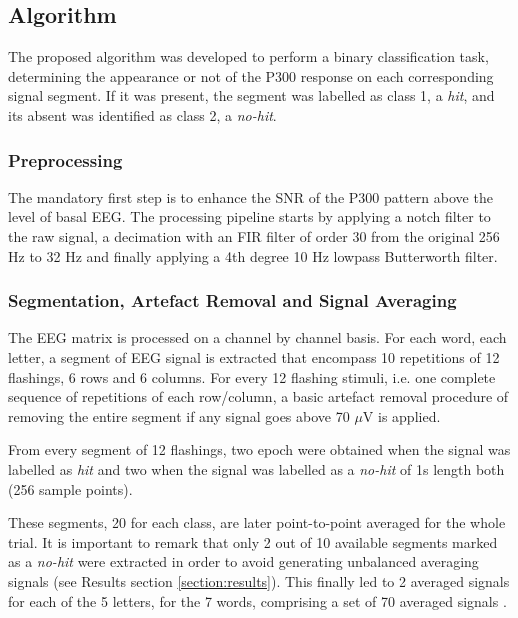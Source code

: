 \documentclass[entropy,article,submit,moreauthors,pdftex,10pt,a4paper]{mdpi}
\begin{document}
\subsection{Algorithm}

The proposed algorithm was developed to perform a binary classification task, determining the appearance or not of the P300 response on each corresponding signal segment.  If it was present, the segment was labelled as class 1, a \textit{hit}, and its absent was identified as class 2, a \textit{no-hit}.

\subsubsection{Preprocessing}

The mandatory first step is to enhance the SNR of the P300 pattern above the level of basal EEG. The processing pipeline starts by applying a notch filter to the raw signal, a decimation with an FIR filter of order 30 from the original 256 Hz to 32 Hz and finally applying a 4th degree 10 Hz lowpass Butterworth filter.  

\subsubsection{Segmentation, Artefact Removal and Signal Averaging}

The EEG matrix is processed on a channel by channel basis.  For each word, each letter, a segment of EEG signal is extracted that encompass 10 repetitions of 12 flashings, 6 rows and 6 columns.  For every 12 flashing stimuli, i.e. one complete sequence of repetitions of each row/column, a basic artefact removal procedure of removing the entire segment if any signal goes above 70 $\mu$V is applied.

From every segment of 12 flashings, two epoch were obtained when the signal was labelled as \textit{hit} and two when the signal was labelled as a \textit{no-hit} of 1s length both (256 sample points).  

These segments, 20 for each class, are later point-to-point averaged for the whole trial. It is important to remark that only 2 out of 10 available segments marked as a \textit{no-hit} were extracted in order to avoid generating unbalanced averaging signals (see Results section \ref{section:results}). This finally led to 2 averaged signals for each of the 5 letters, for the 7 words, comprising a set of 70 averaged signals \citep{Liang2008}.
\end{document}
